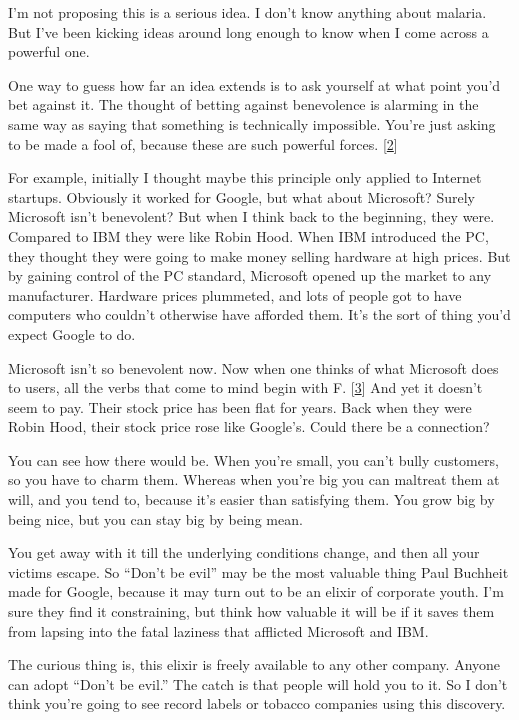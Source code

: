 I'm not proposing this is a serious idea. I don't know anything about
malaria. But I've been kicking ideas around long enough to know when I
come across a powerful one.

One way to guess how far an idea extends is to ask yourself at what
point you'd bet against it. The thought of betting against benevolence
is alarming in the same way as saying that something is technically
impossible. You're just asking to be made a fool of, because these are
such powerful forces. {[}\hyperref[f2n]{2}{]}

For example, initially I thought maybe this principle only applied to
Internet startups. Obviously it worked for Google, but what about
Microsoft? Surely Microsoft isn't benevolent? But when I think back to
the beginning, they were. Compared to IBM they were like Robin Hood.
When IBM introduced the PC, they thought they were going to make money
selling hardware at high prices. But by gaining control of the PC
standard, Microsoft opened up the market to any manufacturer. Hardware
prices plummeted, and lots of people got to have computers who couldn't
otherwise have afforded them. It's the sort of thing you'd expect Google
to do.

Microsoft isn't so benevolent now. Now when one thinks of what Microsoft
does to users, all the verbs that come to mind begin with F.
{[}\hyperref[f3n]{3}{]} And yet it doesn't seem to pay. Their stock
price has been flat for years. Back when they were Robin Hood, their
stock price rose like Google's. Could there be a connection?

You can see how there would be. When you're small, you can't bully
customers, so you have to charm them. Whereas when you're big you can
maltreat them at will, and you tend to, because it's easier than
satisfying them. You grow big by being nice, but you can stay big by
being mean.

You get away with it till the underlying conditions change, and then all
your victims escape. So ``Don't be evil'' may be the most valuable thing
Paul Buchheit made for Google, because it may turn out to be an elixir
of corporate youth. I'm sure they find it constraining, but think how
valuable it will be if it saves them from lapsing into the fatal
laziness that afflicted Microsoft and IBM.

The curious thing is, this elixir is freely available to any other
company. Anyone can adopt ``Don't be evil.'' The catch is that people
will hold you to it. So I don't think you're going to see record labels
or tobacco companies using this discovery.

